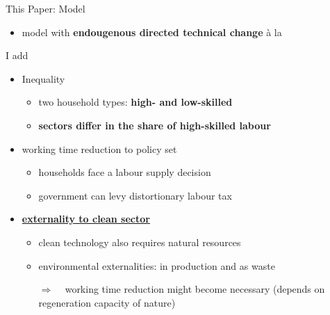 \documentclass[11pt,aspectratio=169]{beamer}
\newcommand{\tr}[1]{\textcolor{blue}{#1}}
\newcommand{\ar}{$\Rightarrow$ \ }
\begin{document}
\begin{frame}{This Paper: Model}
	\begin{itemize}
\item model with \textbf{\alert{endougenous directed technical change}}  à la \cite{Acemoglu2012TheChange}
\end{itemize}
I add 
\begin{itemize}
\item Inequality
\begin{itemize}
\item two household types: \textbf{\alert{high- and low-skilled}}
\item \alert{\textbf{sectors differ in the share of high-skilled labour }}
\end{itemize}
\item working time reduction to policy set
\begin{itemize}
\item households face a labour supply decision
\item government can levy distortionary labour tax 
\end{itemize}

\item %
 \hyperlink{cleanSec}{\textbf{\alert{externality to clean sector}} }
\begin{itemize}
	\item clean technology also requires natural resources
	\item environmental externalities: in production and as waste
	\item[\ar] working time reduction might become necessary (depends on regeneration capacity of nature)
\end{itemize}
	\end{itemize}
\end{frame}
\end{document}

